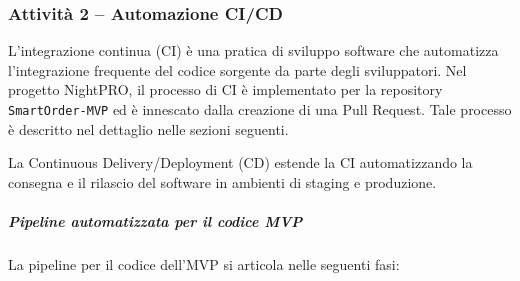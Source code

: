 \documentclass[a4paper, 11pt, oneside]{scrartcl}
\begin{document}
\subsubsection{Attività 2 – Automazione CI/CD}

L'integrazione continua (CI){\scriptsize{}} è una pratica di sviluppo software{\scriptsize{}} che automatizza l'integrazione frequente del codice sorgente da parte degli sviluppatori. Nel progetto NightPRO, il processo di CI è implementato per la repository \texttt{SmartOrder-MVP} ed è innescato dalla creazione di una Pull Request. Tale processo è descritto nel dettaglio nelle sezioni seguenti.

La Continuous Delivery/Deployment (CD){\scriptsize{}} estende la CI automatizzando la consegna e il rilascio del software in ambienti di staging e produzione.

\subparagraph{Pipeline automatizzata per il codice MVP}

La pipeline per il codice dell'MVP si articola nelle seguenti fasi:
\end{document}
